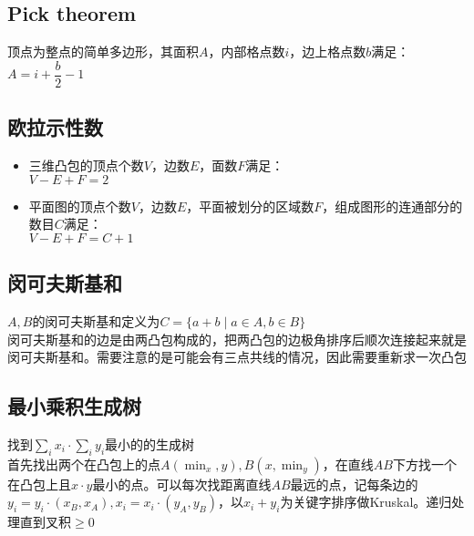 \subsection*{Pick theorem}
    顶点为整点的简单多边形，其面积$ A $，内部格点数$ i $，边上格点数$ b $满足：
    \\$ A = i + \dfrac{b}{2} - 1 $

\subsection*{欧拉示性数}
    \begin{itemize}[wide=0pt]
        \item 三维凸包的顶点个数$ V $，边数$ E $，面数$ F $满足：
        \\$ V - E + F = 2 $
        \item 平面图的顶点个数$ V $，边数$ E $，平面被划分的区域数$ F $，组成图形的连通部分的数目$ C $满足：
        \\$ V - E + F = C + 1 $
    \end{itemize}

\subsection*{闵可夫斯基和}
    \noindent $A, B$的闵可夫斯基和定义为$C = \{ a + b \mid a \in A, b \in B \}$\\
    闵可夫斯基和的边是由两凸包构成的，把两凸包的边极角排序后顺次连接起来就是闵可夫斯基和。需要注意的是可能会有三点共线的情况，因此需要重新求一次凸包

\subsection*{最小乘积生成树}
    \noindent 找到$\sum\limits_i x_i \cdot \sum\limits_i y_i$最小的的生成树\\
    首先找出两个在凸包上的点$A(\min_x, y), B(x, \min_y)$，在直线$AB$下方找一个在凸包上且$x \cdot y$最小的点。可以每次找距离直线$AB$最远的点，记每条边的$y_i = y_i \cdot (x_B, x_A), x_i = x_i \cdot (y_A, y_B)$，以$x_i + y_i$为关键字排序做Kruskal。递归处理直到叉积$\ge 0$

